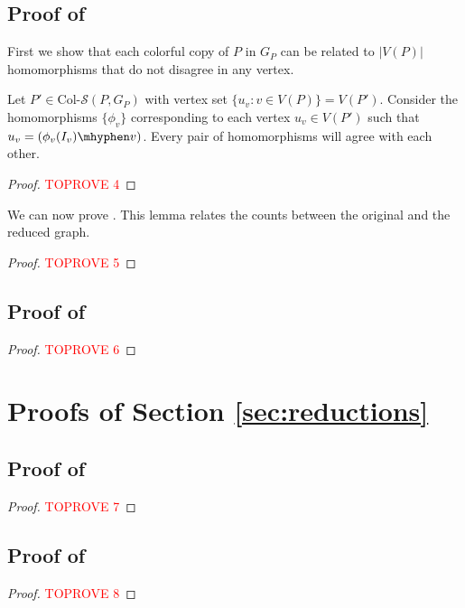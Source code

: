 \documentclass[a4paper,UKenglish,cleveref, autoref, numberwithinsect, thm-restate]{lipics-v2021}
\newcommand{\reduced}[1]{G_{#1}}
\newcommand{\colSetSub}{\text{Col-}\cS}
\newcommand{\cS}{\mathcal{S}}
\begin{document}
	\subsection{Proof of }
	First we show that each colorful copy of $P$ in $\reduced{P}$ can be related to $|V(P)|$ homomorphisms that do not disagree in any vertex.
	
	\begin{claim} \label{clm:connected}
		Let $P' \in \colSetSub(P,\reduced{P})$ with vertex set $\{u_v : v \in V(P)\} = V(P')$. Consider the homomorphisms $\{\phi_v\}$ corresponding to each vertex $u_v \in V(P')$ such that $u_v = (\phi_v(I_v)\mhyphen v)$. Every pair of homomorphisms will agree with each other.
	\end{claim}
	\begin{proof}\textcolor{red}{TOPROVE 4}\end{proof}
	
	We can now prove . This lemma relates the counts between the original and the reduced graph.
	
	\equivalence*
	\begin{proof}\textcolor{red}{TOPROVE 5}\end{proof}

	\subsection{Proof of }
	
	\computablelemma*
	\begin{proof}\textcolor{red}{TOPROVE 6}\end{proof}

	\section{Proofs of Section \ref{sec:reductions}}

	\subsection{Proof of }
		\threesources*
		\begin{proof}\textcolor{red}{TOPROVE 7}\end{proof}

	\subsection{Proof of }
	\threeintersections*
	\begin{proof}\textcolor{red}{TOPROVE 8}\end{proof}
\end{document}
